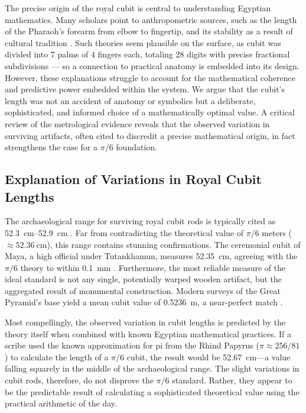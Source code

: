 \documentclass[11pt]{article}
\begin{document}
The precise origin of the royal cubit is central to understanding Egyptian mathematics. Many scholars point to anthropometric sources, such as the length of the Pharaoh's forearm from elbow to fingertip, and its stability as a result of cultural tradition \cite{stone2014cubit, imhausen2016mathematics}. Such theories seem plausible on the surface, as cubit was divided into 7 palms of 4 fingers each, totaling 28 digits with precise fractional subdivisions — so a connection to practical anatomy is embedded into its design. However, these explanations struggle to account for the mathematical coherence and predictive power embedded within the system. We argue that the cubit's length was not an accident of anatomy or symbolics but a deliberate, sophisticated, and informed choice of a mathematically optimal value. A critical review of the metrological evidence reveals that the observed variation in surviving artifacts, often cited to discredit a precise mathematical origin, in fact strengthens the case for a $\pi/6$ foundation.



\subsection{Explanation of Variations in Royal Cubit Lengths}

The archaeological range for surviving royal cubit rods is typically cited as \SIrange{52.3}{52.9}{\centi\meter} \cite{lepsius1865altagyptische}. Far from contradicting the theoretical value of $\pi/6$ meters ($\approx\SI{52.36}{\centi\meter}$), this range contains stunning confirmations. The ceremonial cubit of Maya, a high official under Tutankhamun, measures \SI{52.35}{\centi\meter}, agreeing with the $\pi/6$ theory to within \SI{0.1}{\milli\meter} \cite{imhausen2016mathematics}. Furthermore, the most reliable measure of the ideal standard is not any single, potentially warped wooden artifact, but the aggregated result of monumental construction. Modern surveys of the Great Pyramid's base yield a mean cubit value of \SI{0.5236}{\meter}, a near-perfect match \cite{dash2015survey}.

Most compellingly, the observed variation in cubit lengths is predicted by the theory itself when combined with known Egyptian mathematical practices. If a scribe used the known approximation for pi from the Rhind Papyrus ($\pi \approx 256/81$) to calculate the length of a $\pi/6$ cubit, the result would be \SI{52.67}{\centi\meter}---a value falling squarely in the middle of the archaeological range. The slight variations in cubit rods, therefore, do not disprove the $\pi/6$ standard. Rather, they appear to be the predictable result of calculating a sophisticated theoretical value using the practical arithmetic of the day.
\end{document}
